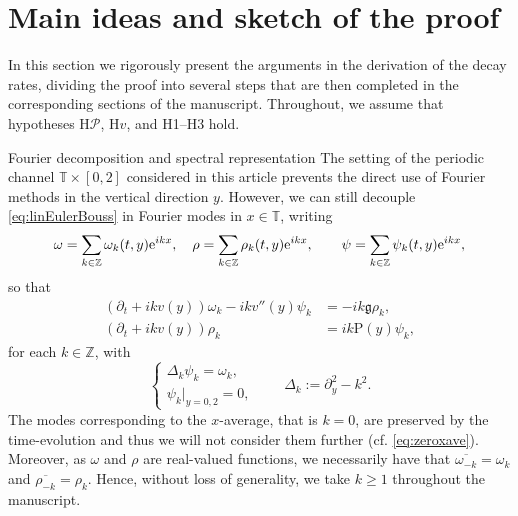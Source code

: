 \documentclass[11pt,reqno]{amsproc}
\makeatletter
\renewcommand\subsection{\@startsection{subsection}{2}%
\normalparindent{.5\linespacing\@plus.7\linespacing}{-.5em}
{\normalfont\bfseries}}
\theoremstyle{definition}
\numberwithin{equation}{section}
\newcommand{\Z}{{\mathbb Z}}
\newcommand{\D}{{\Delta}}
\newcommand{\T}{{\mathbb T}}
\renewcommand{\o}{{\omega}}
\newcommand\e{{\rm e}}
\renewcommand{\P}{{\mathcal{P}}}
\newcommand{\p}{\partial}
\makeatother
\begin{document}
\section{Main ideas and sketch of the proof}\label{sec:sketch}
In this section we rigorously present the arguments in the derivation of the decay rates, dividing the proof into several steps that are then completed in the corresponding sections of the manuscript. Throughout, we assume that hypotheses H$\P$, H$v$, and H1--H3 hold.


\subsection{Fourier decomposition and spectral representation}
The setting of the periodic channel $\T\times[0,2]$ considered in this article prevents the direct use of Fourier methods in the vertical direction $y$. However, we can still decouple \eqref{eq:linEulerBouss}
 in Fourier modes in $x\in\T$, writing
\begin{align*}
\o=\sum_{k\in\Z}\o_k(t,y)\e^{ikx}, \quad \rho=\sum_{k\in\Z}\rho_k(t,y)\e^{ikx}, \qquad \psi=\sum_{k\in\Z}\psi_k(t,y)\e^{ikx},
\end{align*} 
so that 
\begin{equation}\label{eq:linEBomegarho}
\begin{split}
(\partial_t+ikv(y))\omega_k-ikv''(y)\psi_k&=-ik\mathfrak{g}\rho_k, \\ 
(\partial_t+ikv(y))\rho_k&=ik\mathrm{P}(y)\psi_k,
\end{split}
\end{equation}
for each $k\in\Z$, with 
\begin{equation*}
\begin{cases}
\D_k\psi_k =\o_k, \\
\psi_k|_{y=0,2}=0,
\end{cases}
\qquad  \D_k:= \p_y^2-k^2.
\end{equation*}  
The modes corresponding to the $x$-average, that is $k=0$, are preserved by the time-evolution and thus we will not consider them further (cf. \eqref{eq:zeroxave}). 
Moreover, as $\omega$ and $\rho$ are real-valued functions, we necessarily have that $\overline{\omega_{-k}}=\omega_k$ and $\overline{\rho_{-k}}=\rho_k$. Hence, without loss of generality, we take $k\geq 1$ throughout the manuscript.
\end{document}
